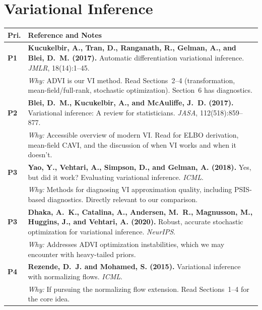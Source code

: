 \documentclass[11pt,a4paper]{article}
\begin{document}
\section{Variational Inference}

\begin{longtable}{@{}p{}p{}@{}}
\toprule
\textbf{Pri.} & \textbf{Reference and Notes} \\
\midrule
\endhead

\textcolor{P1}{\textbf{P1}} &
\textbf{Kucukelbir, A., Tran, D., Ranganath, R., Gelman, A., and Blei, D.~M. (2017).} Automatic differentiation variational inference. \textit{JMLR}, 18(14):1--45. \\
& \textit{Why:} ADVI is our VI method. Read Sections~2--4 (transformation, mean-field/full-rank, stochastic optimization). Section~6 has diagnostics. \\[0.8em]

\textcolor{P2}{\textbf{P2}} &
\textbf{Blei, D.~M., Kucukelbir, A., and McAuliffe, J.~D. (2017).} Variational inference: A review for statisticians. \textit{JASA}, 112(518):859--877. \\
& \textit{Why:} Accessible overview of modern VI. Read for ELBO derivation, mean-field CAVI, and the discussion of when VI works and when it doesn't. \\[0.8em]

\textcolor{P3}{\textbf{P3}} &
\textbf{Yao, Y., Vehtari, A., Simpson, D., and Gelman, A. (2018).} Yes, but did it work? Evaluating variational inference. \textit{ICML}. \\
& \textit{Why:} Methods for diagnosing VI approximation quality, including PSIS-based diagnostics. Directly relevant to our comparison. \\[0.8em]

\textcolor{P3}{\textbf{P3}} &
\textbf{Dhaka, A.~K., Catalina, A., Andersen, M.~R., Magnusson, M., Huggins, J., and Vehtari, A. (2020).} Robust, accurate stochastic optimization for variational inference. \textit{NeurIPS}. \\
& \textit{Why:} Addresses ADVI optimization instabilities, which we may encounter with heavy-tailed priors. \\[0.8em]

\textcolor{P4}{\textbf{P4}} &
\textbf{Rezende, D.~J. and Mohamed, S. (2015).} Variational inference with normalizing flows. \textit{ICML}. \\
& \textit{Why:} If pursuing the normalizing flow extension. Read Sections~1--4 for the core idea. \\

\bottomrule
\end{longtable}
\end{document}
